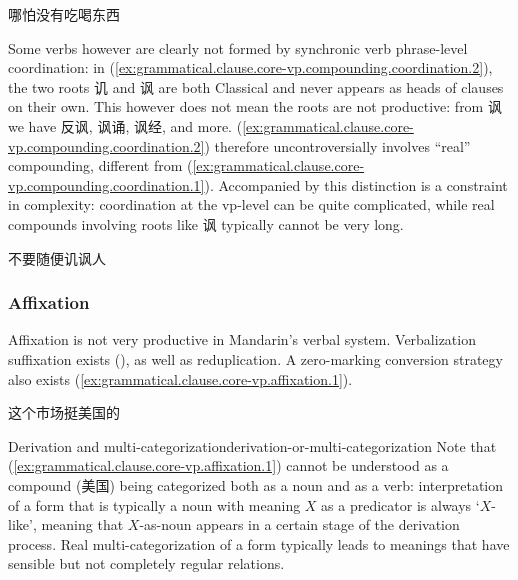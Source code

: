 \documentclass[UTF8, a4paper, oneside, scheme=plain, 12pt]{ctexrep}
\newcommand{\translate}[1]{`#1'}
\begin{document}
\begin{exe}
    \ex\label{ex:grammatical.clause.core-vp.compounding.coordination.1} 哪怕没有吃喝东西
\end{exe}

Some verbs however are clearly not formed by synchronic verb phrase-level coordination:
in (\ref{ex:grammatical.clause.core-vp.compounding.coordination.2}),
the two roots 讥 and 讽 are both Classical and never 
appears as heads of clauses on their own.
This however does not mean the roots are not productive:
from 讽 we have 反讽, 讽诵, 讽经, and more.
(\ref{ex:grammatical.clause.core-vp.compounding.coordination.2}) therefore uncontroversially involves 
``real'' compounding,
different from (\ref{ex:grammatical.clause.core-vp.compounding.coordination.1}).
Accompanied by this distinction is a constraint in complexity:
coordination at the \ac{vp}-level can be quite complicated,
while real compounds involving roots like 讽 typically cannot be very long.

\begin{exe}
    \ex\label{ex:grammatical.clause.core-vp.compounding.coordination.2} 不要随便讥讽人
\end{exe}

\subsubsection{Affixation}\label{sec:grammatical.clause.core-vp.affix}

Affixation is not very productive in Mandarin's verbal system.
Verbalization suffixation exists
(),
as well as reduplication.
A zero-marking conversion strategy also exists (\ref{ex:grammatical.clause.core-vp.affixation.1}).

\begin{exe}
    \ex\label{ex:grammatical.clause.core-vp.affixation.1} 这个市场挺美国的
\end{exe}

\begin{theorybox}{Derivation and multi-categorization}{derivation-or-multi-categorization}
    Note that (\ref{ex:grammatical.clause.core-vp.affixation.1})
    cannot be understood as a compound (美国) being categorized both as a noun and as a verb:
    interpretation of a form that is typically a noun with meaning $X$ as a predicator
    is always \translate{$X$-like},
    meaning that $X$-as-noun appears in a certain stage of the derivation process.
    Real multi-categorization of a form typically leads to meanings that have sensible but not completely regular relations.
\end{theorybox}
\end{document}
